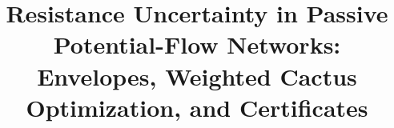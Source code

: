 \documentclass[11pt]{article}
\title{Resistance Uncertainty in Passive Potential-Flow Networks: Envelopes, Weighted Cactus Optimization, and Certificates}
\author{}
\date{}
\begin{document}
\maketitle
\begin{abstract}

\end{abstract}
\tableofcontents











\nocite{*}


\end{document}
